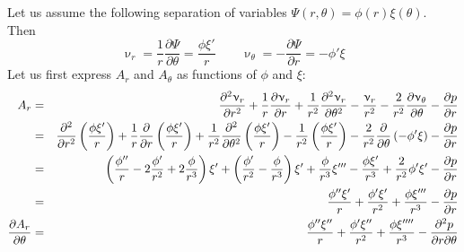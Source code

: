 Let us assume the following separation of variables $\boxed{\Psi(r,\theta)=\phi(r)\xi(\theta)}$.
Then 
\[
\upnu_r = \frac{1}{r}\frac{\partial \Psi}{\partial \theta} = \frac{\phi \xi'}{r}
\quad\quad
\upnu_\theta = - \frac{\partial \Psi}{\partial r} = -\phi' \xi
\]
Let us first express $A_r$ and $A_\theta$ as functions of $\phi$ and $\xi$:
\begin{eqnarray}
A_r 
&=& 
\frac{\partial^2 \upnu_r}{\partial r^2} 
+ \frac{1}{r} \frac{\partial \upnu_r}{\partial r} +   
\frac{1}{r^2} \frac{\partial^2 \upnu_r}{\partial \theta^2}
- \frac{\upnu_r}{r^2} 
- \frac{2}{r^2} \frac{\partial \upnu_\theta}{\partial \theta} -\frac{\partial p}{\partial r}\nonumber\\ 
&=& 
\frac{\partial^2 }{\partial r^2}  \left(\frac{\phi \xi'}{r} \right)
+ \frac{1}{r} \frac{\partial }{\partial r}  \left(\frac{\phi \xi'}{r}\right)  
+\frac{1}{r^2} \frac{\partial^2 }{\partial \theta^2}
\left(\frac{\phi \xi'}{r}\right)
- \frac{1}{r^2} \left(\frac{\phi \xi'}{r}\right)
- \frac{2}{r^2} \frac{\partial }{\partial \theta} 
\left(-\phi' \xi \right) -\frac{\partial p}{\partial r}\nonumber\\
&=& 
\left(\frac{\phi''}{r} -2\frac{\phi'}{r^2} + 2\frac{\phi}{r^3} \right)\xi'
+ \left(\frac{\phi'}{r^2} - \frac{\phi}{r^3} \right ) \xi' 
+\frac{\phi }{r^3} \xi'''  
-  \frac{\phi \xi'}{r^3}
+ \frac{2}{r^2} \phi' \xi' -\frac{\partial p}{\partial r}\nonumber\\
&=&
\frac{\phi'' \xi'}{r} + \frac{\phi' \xi'}{r^2} + \frac{\phi\xi''' }{r^3}
-\frac{\partial p}{\partial r}
\nonumber\\
\frac{\partial A_r}{\partial \theta} &=& 
\frac{\phi'' \xi''}{r} + \frac{\phi' \xi''}{r^2} + \frac{\phi\xi'''' }{r^3}
-\frac{\partial^2 p}{\partial r \partial \theta}
\end{eqnarray}

